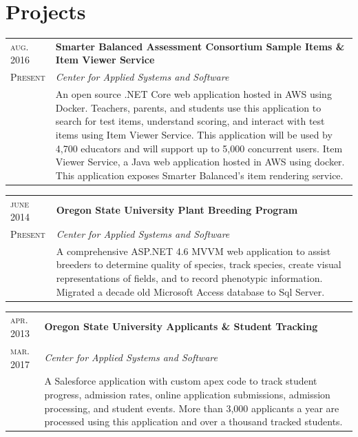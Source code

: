 \documentclass[10pt]{article}
\newenvironment{sectiontable}{ \begin{tabular}{p{16mm}|p{16cm}} }{ \end{tabular} }
\begin{document}
\section{Projects}

\begin{sectiontable}
{\small\textsc{aug. 2016}} 	& \textbf{Smarter Balanced Assessment Consortium Sample Items \& Item Viewer Service}\\
{\small\textsc{Present}}  & \emph{Center for Applied Systems and Software}\\
					& \rule{0pt}{2.3ex}\noindent    
An open source .NET Core web application hosted in AWS using Docker. Teachers, parents, and students use this application to search for test items, understand scoring, and interact with test items using Item Viewer Service. This application will be used by 4,700 educators and will support up to 5,000 concurrent users.
Item Viewer Service, a Java web application hosted in AWS using docker. This application exposes Smarter Balanced's item rendering service.
\end{sectiontable} 


\begin{sectiontable}
{\small\textsc{june 2014}} 	& \textbf{Oregon State University Plant Breeding Program}\\
{\small\textsc{Present}}  & \emph{Center for Applied Systems and Software}\\
					& \rule{0pt}{2.3ex}\noindent    
A comprehensive ASP.NET 4.6 MVVM web application to assist breeders to determine quality of species, track species, create visual representations of fields, and to record phenotypic information. Migrated a decade old Microsoft Access database to Sql Server.
\end{sectiontable} 

\begin{sectiontable}
{\small\textsc{apr. 2013}} 	& \textbf{Oregon State University Applicants \& Student Tracking}\\
{\small\textsc{mar. 2017}}  & \emph{Center for Applied Systems and Software}\\
					& \rule{0pt}{2.3ex}\noindent    
A Salesforce application with custom apex code to track student progress, admission rates, online application submissions, admission processing, and student events. More than 3,000 applicants a year are processed using this application and over a thousand tracked students.
\end{sectiontable} 
\end{document}
